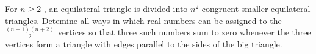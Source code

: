 For $n\geq 2$ , an equilateral triangle is divided into $n^2$ congruent smaller equilateral triangles. Detemine all ways in which real numbers can be assigned to the $\frac{(n+1)(n+2)}{2}$ vertices so that three such numbers sum to zero whenever the three vertices form a triangle with edges parallel to the sides of the big triangle.